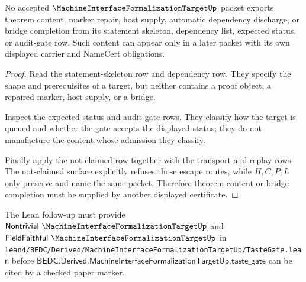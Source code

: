 \begin{theorem}
\label{thm:machine-interface-formalization-target-nonescape}
No accepted $\MachineInterfaceFormalizationTargetUp$ packet exports theorem content, marker repair, host supply, automatic dependency discharge, or bridge completion from its statement skeleton, dependency list, expected status, or audit-gate row. Such content can appear only in a later packet with its own displayed carrier and NameCert obligations.
\end{theorem}
\begin{proof}
Read the statement-skeleton row and dependency row. They specify the shape and prerequisites of a target, but neither contains a proof object, a repaired marker, host supply, or a bridge.

Inspect the expected-status and audit-gate rows. They classify how the target is queued and whether the gate accepts the displayed status; they do not manufacture the content whose admission they classify.

Finally apply the not-claimed row together with the transport and replay rows. The not-claimed surface explicitly refuses those escape routes, while $H,C,P,L$ only preserve and name the same packet. Therefore theorem content or bridge completion must be supplied by another displayed certificate.
\end{proof}



The Lean follow-up must provide $\mathsf{Nontrivial}\ \MachineInterfaceFormalizationTargetUp$ and $\mathsf{FieldFaithful}\ \MachineInterfaceFormalizationTargetUp$ in \texttt{lean4/BEDC/Derived/MachineInterfaceFormalizationTargetUp/TasteGate.lean} before $\mathsf{BEDC.Derived.MachineInterfaceFormalizationTargetUp.taste\_gate}$ can be cited by a checked paper marker.

